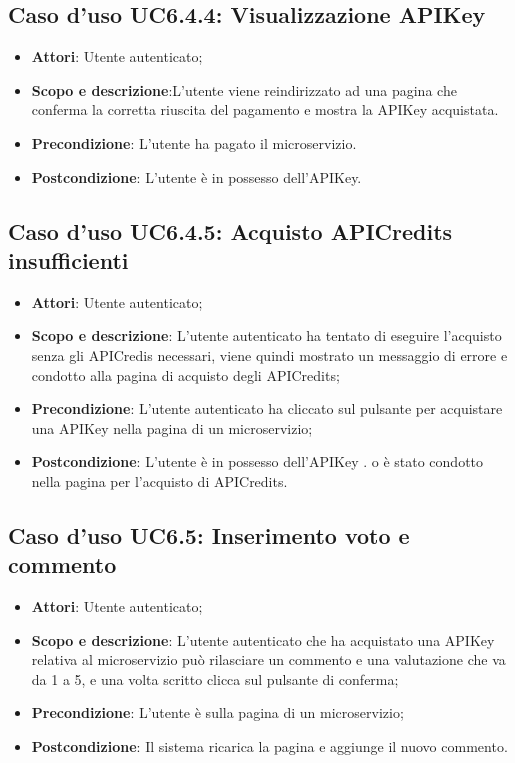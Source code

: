 \documentclass[12pt,a4paper,titlepage]{article}
\begin{document}
	\subsection{Caso d'uso UC6.4.4: Visualizzazione APIKey}
	\label{UC6.4.4}
	\begin{itemize}
		\item \textbf{Attori}: Utente autenticato;
		\item \textbf{Scopo e descrizione}:L'utente viene reindirizzato ad una pagina che conferma la corretta riuscita del pagamento e mostra la APIKey acquistata.
		\item \textbf{Precondizione}: L'utente ha pagato il microservizio.
		\item \textbf{Postcondizione}: L'utente è in possesso dell'APIKey.
	\end{itemize}
	\subsection{Caso d'uso UC6.4.5: Acquisto APICredits insufficienti}
	\label{UC6.4.5}
	\begin{itemize}
		\item \textbf{Attori}: Utente autenticato;
		\item \textbf{Scopo e descrizione}: L'utente autenticato ha tentato di eseguire l'acquisto senza gli APICredis necessari, viene quindi mostrato un messaggio di errore e condotto alla pagina di acquisto degli APICredits;
		\item \textbf{Precondizione}: L'utente autenticato ha cliccato sul pulsante per acquistare una APIKey nella pagina di un microservizio;
		\item \textbf{Postcondizione}: L'utente è in possesso dell'APIKey . o è stato condotto nella pagina per l'acquisto di APICredits.
	\end{itemize}
	\subsection{Caso d'uso UC6.5: Inserimento voto e commento}
	\label{UC6.5}
	\begin{itemize}
		\item \textbf{Attori}: Utente autenticato;
		\item \textbf{Scopo e descrizione}: L'utente autenticato che ha acquistato una APIKey relativa al microservizio può rilasciare un commento e una valutazione che va da 1 a 5, e una volta scritto clicca sul pulsante di conferma;
		\item \textbf{Precondizione}: L'utente è sulla pagina di un microservizio;
		\item \textbf{Postcondizione}: Il sistema ricarica la pagina e aggiunge il nuovo commento.
	\end{itemize}
\end{document}
